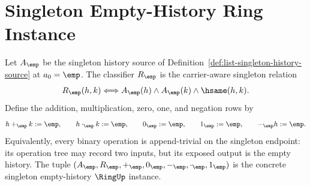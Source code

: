 \section{Singleton Empty-History Ring Instance}
\label{sec:ring-singleton-empty-history-instance}

\begin{definition}
\label{def:ring-singleton-empty-history-instance}
Let $A_{\emp}$ be the singleton history source of
Definition~\ref{def:list-singleton-history-source} at $a_0=\emp$. The
classifier $R_{\emp}$ is the carrier-aware singleton relation
$$
R_{\emp}(h,k)\Longleftrightarrow
A_{\emp}(h)\land A_{\emp}(k)\land \hsame(h,k).
$$
Define the addition, multiplication, zero, one, and negation rows by
$$
h+_{\emp}k:=\emp,\qquad
h\cdot_{\emp}k:=\emp,\qquad
0_{\emp}:=\emp,\qquad
1_{\emp}:=\emp,\qquad
-_{\emp}h:=\emp.
$$
Equivalently, every binary operation is append-trivial on the singleton
endpoint: its operation tree may record two inputs, but its exposed output is
the empty history. The tuple
$(A_{\emp},R_{\emp},+_{\emp},0_{\emp},-_{\emp},\cdot_{\emp},1_{\emp})$
is the concrete singleton empty-history $\RingUp$ instance.
\end{definition}

